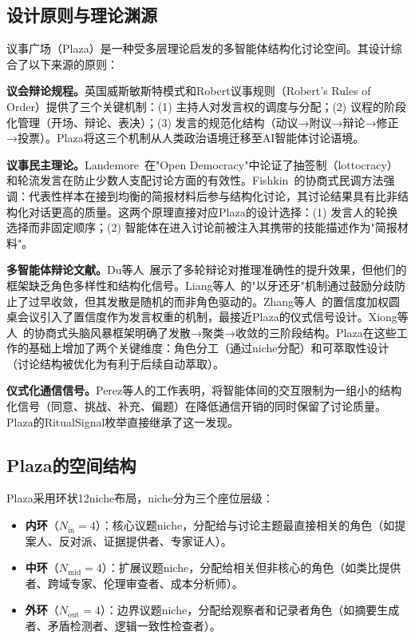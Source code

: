 \documentclass[conference]{IEEEtran}
\begin{document}
\subsection{设计原则与理论渊源}

议事广场（Plaza）是一种受多层理论启发的多智能体结构化讨论空间。其设计综合了以下来源的原则：

\textbf{议会辩论规程。}英国威斯敏斯特模式和Robert议事规则（Robert's Rules of Order）提供了三个关键机制：(1) 主持人对发言权的调度与分配；(2) 议程的阶段化管理（开场、辩论、表决）；(3) 发言的规范化结构（动议→附议→辩论→修正→投票）。Plaza将这三个机制从人类政治语境迁移至AI智能体讨论语境。

\textbf{议事民主理论。}Landemore~\cite{landemore2020open}在"Open Democracy"中论证了抽签制（lottocracy）和轮流发言在防止少数人支配讨论方面的有效性。Fishkin~\cite{fishkin2018democracy}的协商式民调方法强调：代表性样本在接到均衡的简报材料后参与结构化讨论，其讨论结果具有比非结构化对话更高的质量。这两个原理直接对应Plaza的设计选择：(1) 发言人的轮换选择而非固定顺序；(2) 智能体在进入讨论前被注入其携带的技能描述作为"简报材料"。

\textbf{多智能体辩论文献。}Du等人~\cite{du2023improving}展示了多轮辩论对推理准确性的提升效果，但他们的框架缺乏角色多样性和结构化信号。Liang等人~\cite{liang2023encouraging}的"以牙还牙"机制通过鼓励分歧防止了过早收敛，但其发散是随机的而非角色驱动的。Zhang等人~\cite{zhang2024reconcile}的置信度加权圆桌会议引入了置信度作为发言权重的机制，最接近Plaza的仪式信号设计。Xiong等人~\cite{xiong2023dubi}的协商式头脑风暴框架明确了发散→聚类→收敛的三阶段结构。Plaza在这些工作的基础上增加了两个关键维度：角色分工（通过niche分配）和可萃取性设计（讨论结构被优化为有利于后续自动萃取）。

\textbf{仪式化通信信号。}Perez等人的工作表明，将智能体间的交互限制为一组小的结构化信号（同意、挑战、补充、偏题）在降低通信开销的同时保留了讨论质量。Plaza的RitualSignal枚举直接继承了这一发现。

\subsection{Plaza的空间结构}

Plaza采用环状12niche布局，niche分为三个座位层级：

\begin{itemize}[nosep]
\item \textbf{内环}（$N_{\text{in}}=4$）：核心议题niche，分配给与讨论主题最直接相关的角色（如提案人、反对派、证据提供者、专家证人）。
\item \textbf{中环}（$N_{\text{mid}}=4$）：扩展议题niche，分配给相关但非核心的角色（如类比提供者、跨域专家、伦理审查者、成本分析师）。
\item \textbf{外环}（$N_{\text{out}}=4$）：边界议题niche，分配给观察者和记录者角色（如摘要生成者、矛盾检测者、逻辑一致性检查者）。
\end{itemize}
\end{document}
